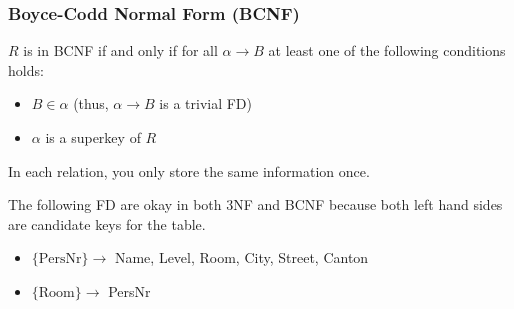 \subsubsection{Boyce-Codd Normal Form (BCNF)}
$R$ is in BCNF if and only if for all $\alpha \rightarrow B$ at least one of the following conditions holds:
\begin{itemize}
    \item $B \in \alpha$ (thus, $\alpha \rightarrow B$ is a trivial FD)
    \item $\alpha$ is a \gls{superkey} of $R$
\end{itemize}
\inlineintuition In each relation, you only store the same information once.

The following FD are okay in both 3NF and BCNF because both left hand sides are candidate keys for the table.
\begin{itemize}
    \item $\{ \text{PersNr} \} \rightarrow $ Name, Level, Room, City, Street, Canton
    \item $\{ \text{Room} \} \rightarrow $ PersNr
\end{itemize}
